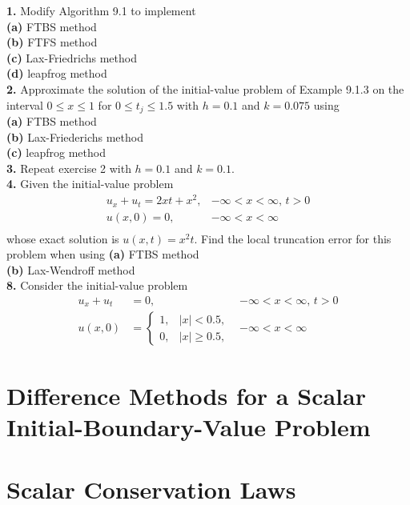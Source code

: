 \documentclass{amsbook}%
\theoremstyle{plain}
\numberwithin{equation}{section}
\begin{document}
		\noindent\textbf{1.} Modify Algorithm 9.1 to implement\\
		\textbf{(a)} FTBS method\\
		\textbf{(b)} FTFS method\\
		\textbf{(c)} Lax-Friedrichs method\\
		\textbf{(d)} leapfrog method\\[12pt]
		
		\noindent\textbf{2.} Approximate the solution of the initial-value problem of Example 9.1.3 on the interval $0\leq x\leq 1$ for $0\leq t_j\leq 1.5$ with $h=0.1$ and $k=0.075$ using\\
		\textbf{(a)} FTBS method\\
		\textbf{(b)} Lax-Friederichs method\\
		\textbf{(c)} leapfrog method\\[12pt]
		
		\noindent\textbf{3.} Repeat exercise 2 with $h=0.1$ and $k=0.1$.\\[12pt]
		
		\noindent\textbf{4.} Given the initial-value problem 
		\begin{align}
			u_x+u_t=2xt+x^2, & -\infty<x<\infty,\, t>0\\
			u(x,0)=0, & -\infty<x<\infty\\
		\end{align}
		whose exact solution is $u(x,t)=x^2t$. Find the local truncation error for this problem when using
		\textbf{(a)} FTBS method\\
		\textbf{(b)} Lax-Wendroff method\\[12pt]
		
		\noindent\textbf{8.} Consider the initial-value problem
		\begin{align}
			u_x+u_t&=0, & -\infty<x<\infty,\, t>0\\
			u(x,0)&=
			\begin{cases}
				1, & |x|<0.5,\\
				0, & |x|\geq 0.5,
			\end{cases} & -\infty<x<\infty
		\end{align}
		
	\section{Difference Methods for a Scalar Initial-Boundary-Value Problem}
	
	\section{Scalar Conservation Laws}
	
\end{document}
